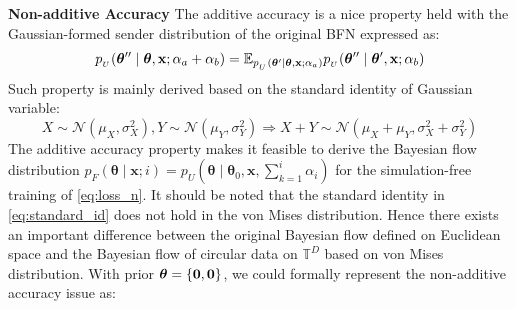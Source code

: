 \textbf{Non-additive Accuracy} 
The additive accuracy is a nice property held with the Gaussian-formed sender distribution of the original BFN expressed as:
\begin{align}
\label{eq:standard_id}
    p_{_U}(\boldsymbol{\theta}{}'' \mid \boldsymbol{\theta}{}, \operatorname{\mathbf{x}}; \alpha_a+\alpha_b) = \mathbb{E}_{p_{_U}(\boldsymbol{\theta}{}' \mid \boldsymbol{\theta}{}, \operatorname{\mathbf{x}}; \alpha_a)} p_{_U}(\boldsymbol{\theta}{}'' \mid \boldsymbol{\theta}{}', \operatorname{\mathbf{x}}; \alpha_b)
\end{align}
Such property is mainly derived based on the standard identity of Gaussian variable:
\begin{equation}
X \sim \mathcal{N}\left(\mu_X, \sigma_X^2\right), Y \sim \mathcal{N}\left(\mu_Y, \sigma_Y^2\right) \Longrightarrow X+Y \sim \mathcal{N}\left(\mu_X+\mu_Y, \sigma_X^2+\sigma_Y^2\right)
\end{equation}
The additive accuracy property makes it feasible to derive the Bayesian flow distribution $
p_F(\boldsymbol{\theta} \mid \mathbf{x} ; i)=p_U\left(\boldsymbol{\theta} \mid \boldsymbol{\theta}_0, \mathbf{x}, \sum_{k=1}^{i} \alpha_i \right)
$ for the simulation-free training of \cref{eq:loss_n}.
It should be noted that the standard identity in \cref{eq:standard_id} does not hold in the von Mises distribution. Hence there exists an important difference between the original Bayesian flow defined on Euclidean space and the Bayesian flow of circular data on $\mathbb{T}^D$ based on von Mises distribution. With prior $\bm{\theta} = \{\bold{0},\bold{0}\}$, we could formally represent the non-additive accuracy issue as:
